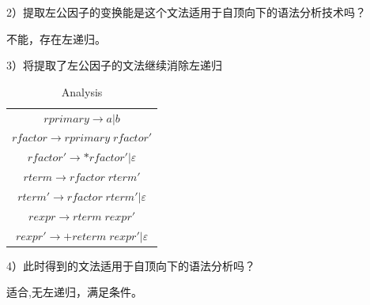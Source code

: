 \documentclass[a4paper, 16pt]{article}
\begin{document}
2）提取左公因子的变换能是这个文法适用于自顶向下的语法分析技术吗？

不能，存在左递归。

3）将提取了左公因子的文法继续消除左递归


\begin{table}[H]
\centering
\caption{Analysis}
\begin{tabular}{c}
\hline
$rprimary \rightarrow a | b$ \\
$rfactor \rightarrow  rprimary \; rfactor'$\\
$rfactor' \rightarrow *rfactor'| \varepsilon$\\
$rterm \rightarrow rfactor \; rterm'$\\
$rterm' \rightarrow rfactor \; rterm' | \varepsilon$\\
$rexpr \rightarrow rterm \;  rexpr' $\\
$rexpr' \rightarrow +reterm \; rexpr' | \varepsilon$\\
\hline
\end{tabular}
\end{table}
4）此时得到的文法适用于自顶向下的语法分析吗？

适合,无左递归，满足条件。
\end{document}
